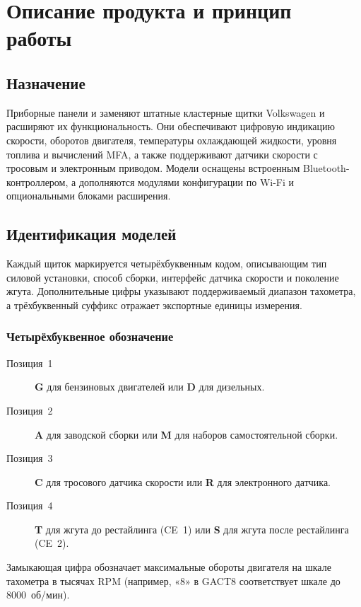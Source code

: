 \chapter{Описание продукта и принцип работы}\label{ch:description-ru}

\section{Назначение}
Приборные панели \ReplicaGenOne{} и \ReplicaNextLong{} заменяют штатные кластерные щитки Volkswagen и расширяют их функциональность.
Они обеспечивают цифровую индикацию скорости, оборотов двигателя, температуры охлаждающей жидкости, уровня топлива и вычислений MFA, а также поддерживают датчики скорости с тросовым и электронным приводом.
Модели \ReplicaGenOneShort{} оснащены встроенным Bluetooth-контроллером, а \ReplicaNextShort{} дополняются модулями конфигурации по Wi-Fi и опциональными блоками расширения.

\section{Идентификация моделей}
Каждый щиток маркируется четырёхбуквенным кодом, описывающим тип силовой установки, способ сборки, интерфейс датчика скорости и поколение жгута.
Дополнительные цифры указывают поддерживаемый диапазон тахометра, а трёхбуквенный суффикс отражает экспортные единицы измерения.

\subsection{Четырёхбуквенное обозначение}
\begin{description}
    \item[Позиция~1] \textbf{G} для бензиновых двигателей или \textbf{D} для дизельных.
    \item[Позиция~2] \textbf{A} для заводской сборки или \textbf{M} для наборов самостоятельной сборки.
    \item[Позиция~3] \textbf{C} для тросового датчика скорости или \textbf{R} для электронного датчика.
    \item[Позиция~4] \textbf{T} для жгута до рестайлинга (CE~1) или \textbf{S} для жгута после рестайлинга (CE~2).
\end{description}
Замыкающая цифра обозначает максимальные обороты двигателя на шкале тахометра в тысячах RPM (например, «8» в GACT8 соответствует шкале до 8000~об/мин).

